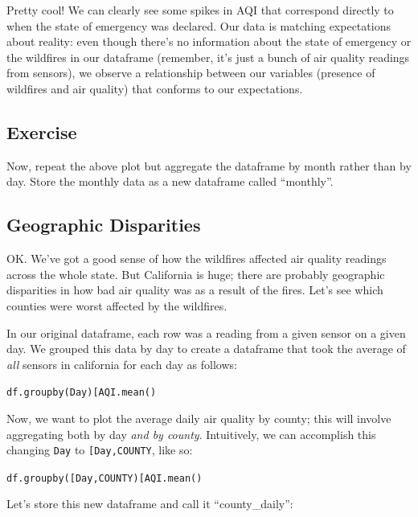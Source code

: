 \documentclass[
  letterpaper,
  DIV=11,
  numbers=noendperiod]{scrreprt}
\begin{document}
Pretty cool! We can clearly see some spikes in AQI that correspond
directly to when the state of emergency was declared. Our data is
matching expectations about reality: even though there's no information
about the state of emergency or the wildfires in our dataframe
(remember, it's just a bunch of air quality readings from sensors), we
observe a relationship between our variables (presence of wildfires and
air quality) that conforms to our expectations.

\hypertarget{exercise-5}{%
\subsection{Exercise}\label{exercise-5}}

Now, repeat the above plot but aggregate the dataframe by month rather
than by day. Store the monthly data as a new dataframe called
``monthly''.

\hypertarget{geographic-disparities}{%
\subsection{Geographic Disparities}\label{geographic-disparities}}

OK. We've got a good sense of how the wildfires affected air quality
readings across the whole state. But California is huge; there are
probably geographic disparities in how bad air quality was as a result
of the fires. Let's see which counties were worst affected by the
wildfires.

In our original dataframe, each row was a reading from a given sensor on
a given day. We grouped this data by day to create a dataframe that took
the average of \emph{all} sensors in california for each day as follows:

\texttt{df.groupby(\textquotesingle{}Day\textquotesingle{}){[}\textquotesingle{}AQI\textquotesingle{}{]}.mean()}

Now, we want to plot the average daily air quality by county; this will
involve aggregating both by day \emph{and by county}. Intuitively, we
can accomplish this changing
\texttt{\textquotesingle{}Day\textquotesingle{}} to
\texttt{{[}\textquotesingle{}Day\textquotesingle{},\textquotesingle{}COUNTY\textquotesingle{}{]}},
like so:

\texttt{df.groupby({[}\textquotesingle{}Day\textquotesingle{},\textquotesingle{}COUNTY\textquotesingle{}{]}){[}\textquotesingle{}AQI\textquotesingle{}{]}.mean()}

Let's store this new dataframe and call it ``county\_daily'':
\end{document}
